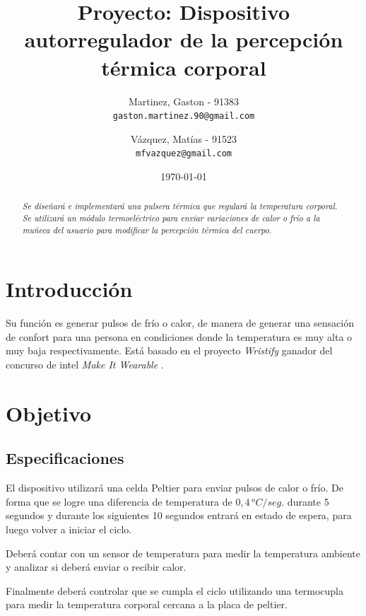 \documentclass[10pt,spanish,a4paper,openany,notitlepage]{article}
\begin{document}
\title{\textbf{Proyecto: Dispositivo autorregulador de la percepción térmica corporal}}
\author{
  Martinez, Gaston - 91383\\
  \texttt{gaston.martinez.90@gmail.com}  
  \and
   Vázquez, Matías - 91523\\
  \texttt{mfvazquez@gmail.com}
}
\date{\today}
\maketitle

\begin{abstract} %
\emph{Se diseñará e implementará una pulsera térmica que regulará la
temperatura corporal. Se utilizará un módulo termoeléctrico para enviar
variaciones de calor o frío a la muñeca del usuario para modificar
la percepción térmica del cuerpo.}
\end{abstract}

\newpage
\tableofcontents
\newpage

\section{Introducción}

Su función es generar pulsos de frío o calor, de manera de generar una sensación de 
confort para una persona en condiciones donde la temperatura es muy alta 
o muy baja respectivamente.
Está basado en el proyecto \emph{Wristify} \cite{embrlabs} ganador del concurso de intel 
\emph{Make It Wearable} \cite{Make It Wearable}.

\section{Objetivo}
\subsection{Especificaciones}

El dispositivo utilizará una celda Peltier para enviar pulsos de calor
o frío. De forma que se logre una diferencia de temperatura de $0,4\, \unit{^oC/seg.}$
durante 5 segundos y durante los siguientes 10 segundos entrará
en estado de espera, para luego volver a iniciar el ciclo. 

Deberá contar con un sensor de temperatura para medir la temperatura ambiente
y analizar si deberá enviar o recibir calor.

Finalmente deberá controlar que se cumpla el ciclo utilizando una termocupla
para medir la temperatura corporal cercana a la placa de peltier.
\end{document}
